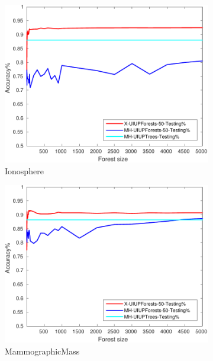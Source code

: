 \begin{figure}[ht]
\begin{subfigure}[b]{0.3\textwidth}
		\centering
  	\includegraphics[width=\textwidth]{figs/PLPTF/Forests/IonosphereDownsampledFurther_Forests_X_MH.pdf}
  	\caption{Ionosphere}
		\label{fig:I3}
	\end{subfigure}
  \begin{subfigure}[b]{0.3\textwidth}
		\centering
  	\includegraphics[width=\textwidth]{figs/PLPTF/Forests/MammographicMassDownsampled_Forests_X_MH.pdf}
  	\caption{MammographicMass}
		\label{fig:Mam3}
	\end{subfigure}
	\\
  \begin{subfigure}[b]{0.3\textwidth}
		\centering

\end{subfigure}
\end{figure}
